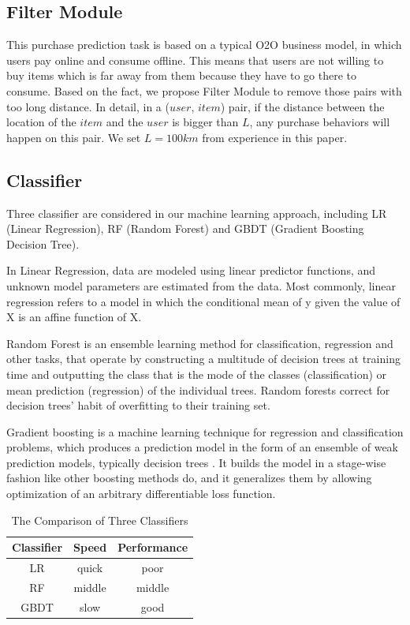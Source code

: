 \documentclass{llncs}
\begin{document}
\subsection{Filter Module}
This purchase prediction task is based on a typical O2O business model,
in which users pay online and consume offline.
This means that users are not willing to buy items
which is far away from them because they have to
go there to consume.
Based on the fact, we propose Filter Module to
remove those pairs with too long distance.
In detail,
in a ($user$, $item$) pair,
if the distance between the location of the $item$ and the $user$ is bigger than $L$,
any purchase behaviors will happen on this pair.
We set $L = 100km$ from experience in this paper.

\subsection{Classifier}
Three classifier are considered in our machine learning approach,
including LR (Linear Regression), RF (Random Forest) and GBDT (Gradient Boosting Decision Tree).

In Linear Regression, data are modeled using linear predictor functions,
and unknown model parameters are estimated from the data.
Most commonly, linear regression refers to a model
in which the conditional mean of y given the value of X
is an affine function of X.

Random Forest \cite{breiman2001random} is an ensemble learning method
for classification, regression and other tasks,
that operate by constructing a multitude of decision trees at training time and
outputting the class that is the mode of the classes (classification)
or mean prediction (regression) of the individual trees.
Random forests correct for decision trees' habit of overfitting to their training set.

Gradient boosting is a machine learning technique for regression and classification problems,
which produces a prediction model in the form of an ensemble of weak prediction models,
typically decision trees \cite{friedman2003multiple}.
It builds the model in a stage-wise fashion like other boosting methods do,
and it generalizes them by allowing optimization of an arbitrary differentiable loss function.

\begin{table}[htbp]
	\normalsize
	\centering
	\caption{The Comparison of Three Classifiers}
	\begin{tabular}{|c|c|c|}
		\hline
		\textbf{Classifier} & \textbf{Speed} & \textbf{Performance} \\
		\hline
		LR & quick & poor \\
		\hline
		RF & middle & middle \\
		\hline
		GBDT & slow & good \\
		\hline
	\end{tabular}
	\label{tab:comparison}
\end{table}
\end{document}
